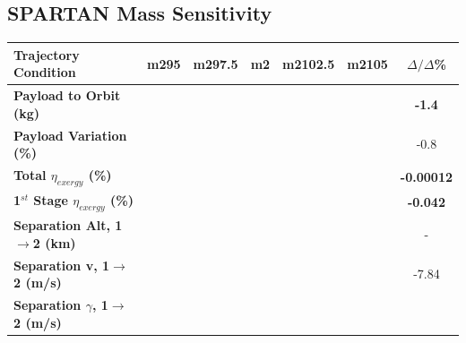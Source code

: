 \subsection{SPARTAN Mass Sensitivity}\label{sec:m2var}


\begin{table}[ht]
\centering
\begin{tabular}{l c c c c c c} 
	\hline \textbf{Trajectory Condition}
	&m295
	&m297.5
	&m2
	&m2102.5
	&m2105
	& $\Delta/\Delta$\%
	\\
	\hline \textbf{Payload to Orbit (kg)}
	& \textbf{\PayloadToOrbitmSPARTANNinetyFive}
	& \textbf{\PayloadToOrbitmSPARTANNinetySevenFive}
	& \textbf{\PayloadToOrbitmSPARTANStandard}
	& \textbf{\PayloadToOrbitmSPARTANOneHundredTwoFive}
	& \textbf{\PayloadToOrbitmSPARTANOneHundredFive}
	&\textbf{-1.4}
	\\
	\textbf{Payload Variation (\%)}
	& \PayloadVarmSPARTANNinetyFive
	& \PayloadVarmSPARTANNinetySevenFive
	& \PayloadVarmSPARTANStandard
	& \PayloadVarmSPARTANOneHundredTwoFive
	& \PayloadVarmSPARTANOneHundredFive
	&-0.8
	\\
	\textbf{Total $\eta_{exergy}$ (\%)}
	& \textbf{\totalExergyEffmSPARTANNinetyFive}
	& \textbf{\totalExergyEffmSPARTANNinetySevenFive}
	& \textbf{\totalExergyEffmSPARTANStandard}
	& \textbf{\totalExergyEffmSPARTANOneHundredTwoFive}
	& \textbf{\totalExergyEffmSPARTANOneHundredFive}
	& \textbf{-0.00012}
	\\
	\hline 
	\textbf{1$^{st}$ Stage $\eta_{exergy}$ (\%)}
	& \textbf{\firstExergyEffmSPARTANNinetyFive}
	& \textbf{\firstExergyEffmSPARTANNinetySevenFive}
	& \textbf{\firstExergyEffmSPARTANStandard}
	& \textbf{\firstExergyEffmSPARTANOneHundredTwoFive}
	& \textbf{\firstExergyEffmSPARTANOneHundredFive}
	& \textbf{-0.042}
	\\
	\textbf{Separation Alt, 1$\rightarrow$2 (km)}
	& \firstsecondSeparationAltmSPARTANNinetyFive
	& \firstsecondSeparationAltmSPARTANNinetySevenFive
	& \firstsecondSeparationAltmSPARTANStandard
	& \firstsecondSeparationAltmSPARTANOneHundredTwoFive
	& \firstsecondSeparationAltmSPARTANOneHundredFive
	& -
	\\
	\textbf{Separation v, 1$\rightarrow$2 (m/s)}
	& \firstsecondSeparationvmSPARTANNinetyFive
	& \firstsecondSeparationvmSPARTANNinetySevenFive
	& \firstsecondSeparationvmSPARTANStandard
	& \firstsecondSeparationvmSPARTANOneHundredTwoFive
	& \firstsecondSeparationvmSPARTANOneHundredFive
	&-7.84
	\\
	\textbf{Separation $\gamma$, 1$\rightarrow$2 (m/s)}
	& \firstsecondSeparationgammamSPARTANNinetyFive

\end{tabular}
\end{table}
